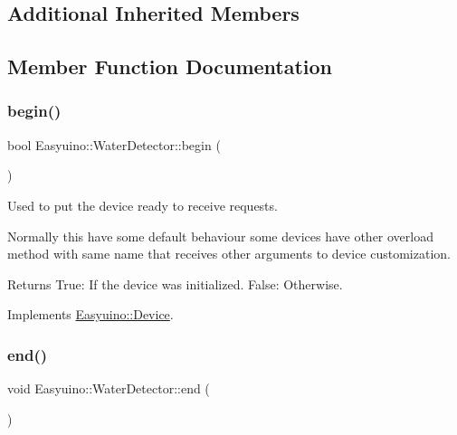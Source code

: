 \subsection*{Additional Inherited Members}


\subsection{Member Function Documentation}
\mbox{\label{class_easyuino_1_1_water_detector_af7a0ec32d6abcb8c1060f493525d5228}} 
\subsubsection{\texorpdfstring{begin()}{begin()}}
{\footnotesize\ttfamily bool Easyuino\+::\+Water\+Detector\+::begin (\begin{DoxyParamCaption}{ }\end{DoxyParamCaption})\hspace{0.3cm}{\ttfamily [virtual]}}



Used to put the device ready to receive requests. 

Normally this have some default behaviour some devices have other overload method with same name that receives other arguments to device customization. \begin{DoxyReturn}{Returns}
True\+: If the device was initialized. False\+: Otherwise. 
\end{DoxyReturn}


Implements \hyperlink{class_easyuino_1_1_device_a2e7bb2fec849719a9d9432b57cdb72ba}{Easyuino\+::\+Device}.

\mbox{\label{class_easyuino_1_1_water_detector_a9c1473536f47b2a7d8e1f8fb1bf5f3fd}} 
\subsubsection{\texorpdfstring{end()}{end()}}
{\footnotesize\ttfamily void Easyuino\+::\+Water\+Detector\+::end (\begin{DoxyParamCaption}{ }\end{DoxyParamCaption})\hspace{0.3cm}{\ttfamily [virtual]}}



